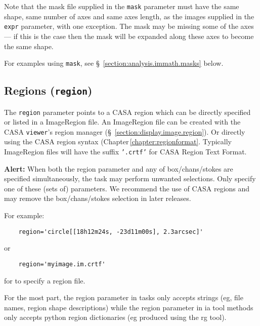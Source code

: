 Note that the mask file supplied in the {\tt mask} parameter must have
the same shape, same number of axes and same axes length, as the
images supplied in the {\tt expr} parameter, with one exception. The mask
may be missing some of the axes --- if this is the case then the mask
will be expanded along these axes to become the same shape.

For examples using {\tt mask}, see \S~\ref{section:analysis.immath.masks} 
below.


\subsection{Regions ({\tt region})}
\label{section:analysis.pars.regions}

The {\tt region} parameter points to a CASA region which can be
directly specified or listed in a ImageRegion file.  An
ImageRegion file can be created with the CASA {\tt viewer}'s region
manager (\S~\ref{section:display.image.region}). Or directly using the
CASA region syntax (Chapter\,\ref{chapter:regionformat}.
Typically ImageRegion files will have the suffix {\tt '.crtf'} for
CASA Region Text Format.  

{\bf Alert:} When both the region parameter and any of
box/chans/stokes are specified simultaneously, the task may perform
unwanted selections. Only specify one of these (sets of)
parameters. We recommend the use of CASA regions and may remove the
box/chans/stokes selection in later releases. 


For example: 
\small
\begin{verbatim}
    region='circle[[18h12m24s, -23d11m00s], 2.3arcsec]'
\end{verbatim}
\normalsize

or

\small
\begin{verbatim}
    region='myimage.im.crtf'
\end{verbatim}
\normalsize

for to specify a region file. 


For the most part, the region parameter in tasks only
accepts strings (eg, file names, region shape descriptions) while the
region parameter in ia tool methods only accepts python region
dictionaries (eg produced using the rg tool).



